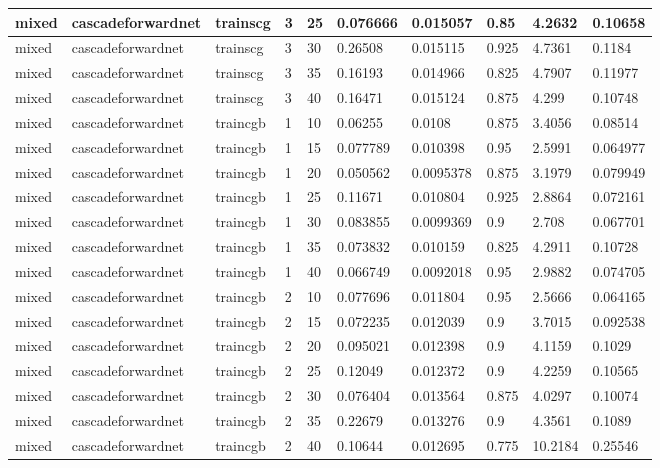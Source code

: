 \begin{longtable}{lllllllll}
mixed & cascadeforwardnet & trainscg & 3 & 25 & 0.076666 & 0.015057 & 0.85 & 4.2632 & 0.10658 \\ \hline 
mixed & cascadeforwardnet & trainscg & 3 & 30 & 0.26508 & 0.015115 & 0.925 & 4.7361 & 0.1184 \\ \hline 
mixed & cascadeforwardnet & trainscg & 3 & 35 & 0.16193 & 0.014966 & 0.825 & 4.7907 & 0.11977 \\ \hline 
mixed & cascadeforwardnet & trainscg & 3 & 40 & 0.16471 & 0.015124 & 0.875 & 4.299 & 0.10748 \\ \hline 
mixed & cascadeforwardnet & traincgb & 1 & 10 & 0.06255 & 0.0108 & 0.875 & 3.4056 & 0.08514 \\ \hline 
mixed & cascadeforwardnet & traincgb & 1 & 15 & 0.077789 & 0.010398 & 0.95 & 2.5991 & 0.064977 \\ \hline 
mixed & cascadeforwardnet & traincgb & 1 & 20 & 0.050562 & 0.0095378 & 0.875 & 3.1979 & 0.079949 \\ \hline 
mixed & cascadeforwardnet & traincgb & 1 & 25 & 0.11671 & 0.010804 & 0.925 & 2.8864 & 0.072161 \\ \hline 
mixed & cascadeforwardnet & traincgb & 1 & 30 & 0.083855 & 0.0099369 & 0.9 & 2.708 & 0.067701 \\ \hline 
mixed & cascadeforwardnet & traincgb & 1 & 35 & 0.073832 & 0.010159 & 0.825 & 4.2911 & 0.10728 \\ \hline 
mixed & cascadeforwardnet & traincgb & 1 & 40 & 0.066749 & 0.0092018 & 0.95 & 2.9882 & 0.074705 \\ \hline 
mixed & cascadeforwardnet & traincgb & 2 & 10 & 0.077696 & 0.011804 & 0.95 & 2.5666 & 0.064165 \\ \hline 
mixed & cascadeforwardnet & traincgb & 2 & 15 & 0.072235 & 0.012039 & 0.9 & 3.7015 & 0.092538 \\ \hline 
mixed & cascadeforwardnet & traincgb & 2 & 20 & 0.095021 & 0.012398 & 0.9 & 4.1159 & 0.1029 \\ \hline 
mixed & cascadeforwardnet & traincgb & 2 & 25 & 0.12049 & 0.012372 & 0.9 & 4.2259 & 0.10565 \\ \hline 
mixed & cascadeforwardnet & traincgb & 2 & 30 & 0.076404 & 0.013564 & 0.875 & 4.0297 & 0.10074 \\ \hline 
mixed & cascadeforwardnet & traincgb & 2 & 35 & 0.22679 & 0.013276 & 0.9 & 4.3561 & 0.1089 \\ \hline 
mixed & cascadeforwardnet & traincgb & 2 & 40 & 0.10644 & 0.012695 & 0.775 & 10.2184 & 0.25546 \\ \hline 

\end{longtable}
